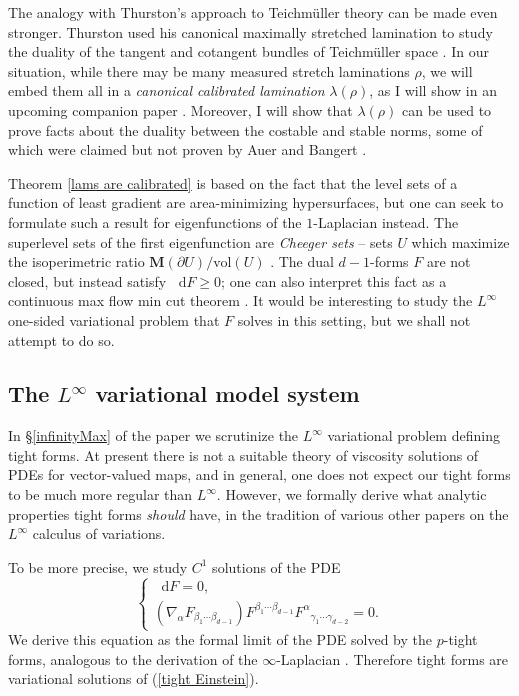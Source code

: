 \documentclass[reqno,11pt]{amsart}
\newcommand*\dif{\mathop{}\!\mathrm{d}}
\newcommand{\vol}{\mathrm{vol}}
\newcommand{\Mass}{\mathbf M}
\newcommand{\dfn}[1]{\emph{#1}\index{#1}}
\theoremstyle{definition}
\numberwithin{equation}{section}
\begin{document}
The analogy with Thurston's approach to Teichm\"uller theory can be made even stronger.
Thurston used his canonical maximally stretched lamination to study the duality of the tangent and cotangent bundles of Teichm\"uller space \cite[\S10]{Thurston98}.
In our situation, while there may be many measured stretch laminations $\rho$, we will embed them all in a \dfn{canonical calibrated lamination} $\lambda(\rho)$, as I will show in an upcoming companion paper \cite{BackusBest2}.
Moreover, I will show that $\lambda(\rho)$ can be used to prove facts about the duality between the costable and stable norms, some of which were claimed but not proven by Auer and Bangert \cite{Auer01}.

Theorem \ref{lams are calibrated} is based on the fact that the level sets of a function of least gradient are area-minimizing hypersurfaces, but one can seek to formulate such a result for eigenfunctions of the $1$-Laplacian instead.
The superlevel sets of the first eigenfunction are \dfn{Cheeger sets} -- sets $U$ which maximize the isoperimetric ratio $\Mass(\partial U)/\vol(U)$ \cite{Kawohl2003}.
The dual $d - 1$-forms $F$ are not closed, but instead satisfy $\dif F \geq 0$; one can also interpret this fact as a continuous max flow min cut theorem \cite{Grieser05}.
It would be interesting to study the $L^\infty$ one-sided variational problem that $F$ solves in this setting, but we shall not attempt to do so.

\subsection{The \texorpdfstring{$L^\infty$ variational}{L-infinity variational} model system}
In \S\ref{infinityMax} of the paper we scrutinize the $L^\infty$ variational problem defining tight forms.
At present there is not a suitable theory of viscosity solutions of PDEs for vector-valued maps, and in general, one does not expect our tight forms to be much more regular than $L^\infty$.
However, we formally derive what analytic properties tight forms \emph{should} have, in the tradition of various other papers \cite{Barron2001,Aronsson67,Sheffield12} on the $L^\infty$ calculus of variations.

To be more precise, we study $C^1$ solutions of the PDE 
\begin{equation}\label{tight Einstein}
\begin{cases}\dif F = 0, \\
	(\nabla_\alpha F_{\beta_1 \cdots \beta_{d - 1}}) F^{\beta_1 \cdots \beta_{d - 1}} {F^\alpha}_{\gamma_1 \cdots \gamma_{d - 2}} = 0.
\end{cases}
\end{equation}
We derive this equation as the formal limit of the PDE solved by the $p$-tight forms, analogous to the derivation of the $\infty$-Laplacian \cite{Aronsson67}.
Therefore tight forms are variational solutions of (\ref{tight Einstein}).
\end{document}
